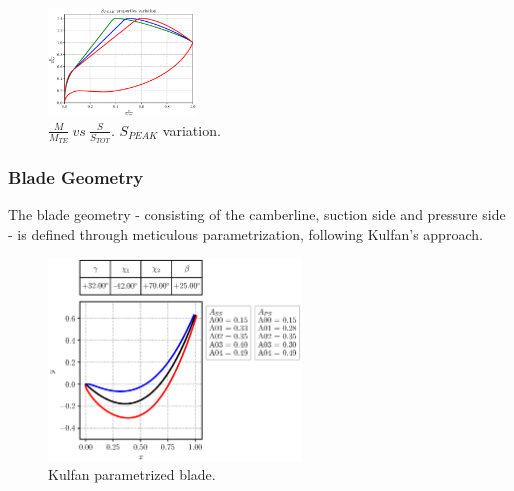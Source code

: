 \documentclass[11pt,a4paper,twocolumn]{article}
\newcommand\width{0.35}
\begin{document}
\begin{figure}[!h]
    \centering
    \includegraphics[width=\width\textwidth]{pyFigure/figures/load-SPEAK.eps}
    \caption{$\frac{M}{M_{TE}} \ vs \ \frac{S}{S_{TOT}}$. $S_{PEAK}$ variation.}    
    \label{fig:SPEAK}
\end{figure}

\subsubsection{Blade Geometry}

The blade geometry - consisting of the camberline, suction side and pressure side - is defined through meticulous parametrization, following Kulfan's approach. 

\begin{figure}[!h]
    \centering 
    \hspace*{-1.7cm}
    \includegraphics[width=0.6\textwidth]{pyFigure/figures/blade.eps}
    \caption{Kulfan parametrized blade.}
    \label{fig:blade}
\end{figure}
\end{document}
